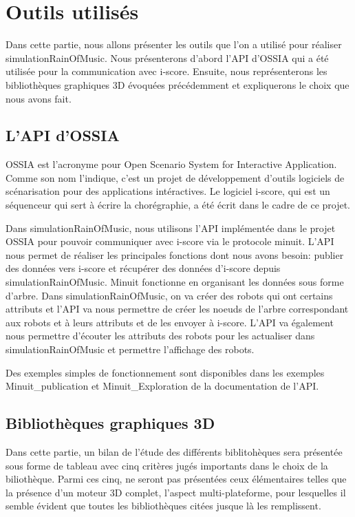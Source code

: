 \section{Outils utilisés}

Dans cette partie, nous allons présenter les outils que l'on a utilisé pour réaliser simulationRainOfMusic. Nous présenterons d'abord l'API d'OSSIA qui a été utilisée pour la communication avec i-score. Ensuite, nous représenterons les bibliothèques graphiques 3D évoquées précédemment et expliquerons le choix que nous avons fait.

\subsection{L'API d'OSSIA}

OSSIA est l'acronyme pour Open Scenario System for Interactive Application. Comme son nom l'indique, c'est un projet de développement d'outils logiciels de scénarisation pour des applications intéractives. Le logiciel i-score, qui est un séquenceur qui sert à écrire la chorégraphie, a été écrit dans le cadre de ce projet. 

Dans simulationRainOfMusic, nous utilisons l'API implémentée dans le projet OSSIA pour pouvoir communiquer avec i-score via le protocole minuit. L'API nous permet de réaliser les principales fonctions dont nous avons besoin: publier des données vers i-score et récupérer des données d'i-score depuis simulationRainOfMusic.  Minuit fonctionne en organisant les données sous forme d'arbre. Dans simulationRainOfMusic, on va créer des robots qui ont certains attributs et l'API va nous permettre de créer les noeuds de l'arbre correspondant aux robots et à leurs attributs et de les envoyer à i-score. L'API va également nous permettre d'écouter les attributs des robots pour les actualiser dans simulationRainOfMusic et permettre l'affichage des robots. 

Des exemples simples de fonctionnement sont disponibles dans les exemples Minuit_publication et Minuit_Exploration de la documentation de l'API.

\subsection{Bibliothèques graphiques 3D}

Dans cette partie, un bilan de l'étude des différents biblitohèques sera présentée sous forme de tableau avec cinq critères jugés importants dans le choix de la biliothèque. Parmi ces cinq, ne seront pas présentées ceux élémentaires telles que la présence d'un moteur 3D complet, l'aspect multi-plateforme, pour lesquelles il semble évident que toutes les bibliothèques citées jusque là les remplissent.

